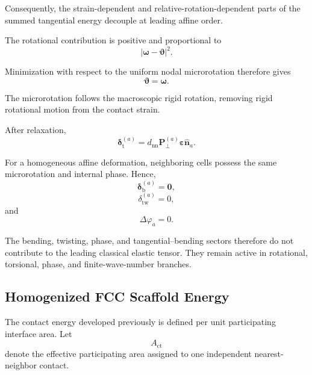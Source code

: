 Consequently, the strain-dependent and relative-rotation-dependent parts of the summed tangential energy decouple at leading affine order.

The rotational contribution is positive and proportional to
\begin{equation}
    \left| \boldsymbol{\omega} - \boldsymbol{\vartheta} \right|^2.
\end{equation}

Minimization with respect to the uniform nodal microrotation therefore gives
\begin{equation}
    \boxed{ \boldsymbol{\vartheta} = \boldsymbol{\omega}. }
\end{equation}

The microrotation follows the macroscopic rigid rotation, removing rigid rotational motion from the contact strain.

After relaxation,
\begin{equation}
    \boxed{ \boldsymbol{\delta}_{\mathrm{t}}^{(a)} = d_{\mathrm{nn}} \mathbf{P}_{\perp}^{(a)} \boldsymbol{\varepsilon} \hat{\mathbf{n}}_a. }
\end{equation}

For a homogeneous affine deformation, neighboring cells possess the same microrotation and internal phase. Hence,
\begin{equation}
    \boldsymbol{\delta}_{\mathrm{b}}^{(a)} = \mathbf{0},
\end{equation}
\begin{equation}
    \delta_{\mathrm{tw}}^{(a)} = 0,
\end{equation}
and
\begin{equation}
    \Delta\varphi_a = 0.
\end{equation}

The bending, twisting, phase, and tangential--bending sectors therefore do not contribute to the leading classical elastic tensor. They remain active in rotational, torsional, phase, and finite-wave-number branches.

\subsection{Homogenized FCC Scaffold Energy}

The contact energy developed previously is defined per unit participating interface area. Let
\begin{equation}
    A_{\mathrm{ct}}
\end{equation}
denote the effective participating area assigned to one independent nearest-neighbor contact.

